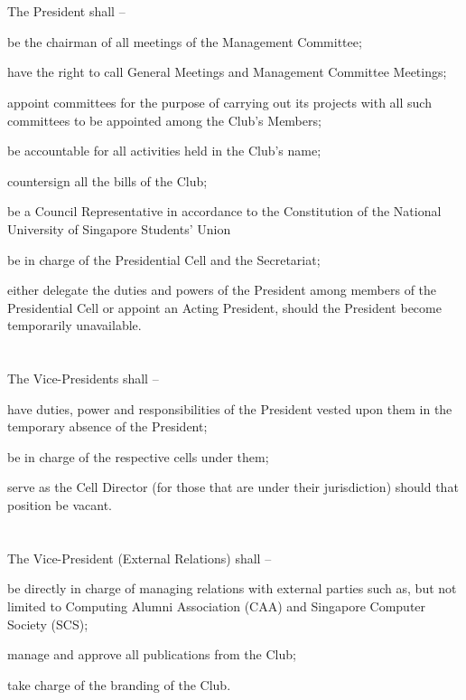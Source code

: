 
\section{}
The President shall –
	\begin{legal}
	\item be the chairman of all meetings of the Management Committee;
	\item have the right to call General Meetings and Management Committee Meetings;
	\item appoint committees for the purpose of carrying out its projects with all such committees to be appointed among the Club’s Members;
	\item be accountable for all activities held in the Club’s name;
	\item countersign all the bills of the Club;
	\item be a Council Representative in accordance to the Constitution of the National University of Singapore Students' Union
	\item be in charge of the Presidential Cell and the Secretariat;
	\item either delegate the duties and powers of the President among members of the Presidential Cell or appoint an Acting President, should the President become temporarily unavailable.
	\end{legal}

\section{}
The Vice-Presidents shall –
	\begin{legal}
	\item have duties, power and responsibilities of the President vested upon them in the temporary absence of the President;
	\item be in charge of the respective cells under them;
	\item serve as the Cell Director (for those that are under their jurisdiction) should that position be vacant.
	\end{legal}

\section{}
The Vice-President (External Relations) shall –
	\begin{legal}
	\item be directly in charge of managing relations with external parties such as, but not limited to Computing Alumni Association (CAA) and Singapore Computer Society (SCS);
	\item manage and approve all publications from the Club;
	\item take charge of the branding of the Club.
	\end{legal}

